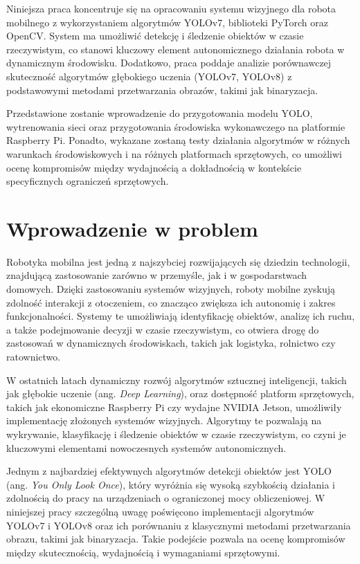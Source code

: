 \documentclass[a4paper,twoside,12pt]{book}
\begin{document}
Niniejsza praca koncentruje się na opracowaniu systemu wizyjnego dla robota mobilnego z wykorzystaniem algorytmów YOLOv7, biblioteki PyTorch oraz OpenCV. System ma umożliwić detekcję i śledzenie obiektów w czasie rzeczywistym, co stanowi kluczowy element autonomicznego działania robota w dynamicznym środowisku. Dodatkowo, praca poddaje analizie porównawczej skuteczność algorytmów głębokiego uczenia (YOLOv7, YOLOv8) z podstawowymi metodami przetwarzania obrazów, takimi jak binaryzacja. 

Przedstawione zostanie wprowadzenie do przygotowania modelu YOLO, wytrenowania sieci oraz przygotowania środowiska wykonawczego na platformie Raspberry Pi. Ponadto, wykazane zostaną testy działania algorytmów w różnych warunkach środowiskowych i na różnych platformach sprzętowych, co umożliwi ocenę kompromisów między wydajnością a dokładnością w kontekście specyficznych ograniczeń sprzętowych.

\newpage

\section{Wprowadzenie w problem}
Robotyka mobilna jest jedną z najszybciej rozwijających się dziedzin technologii, znajdującą zastosowanie zarówno w przemyśle, jak i w gospodarstwach domowych. Dzięki zastosowaniu systemów wizyjnych, roboty mobilne zyskują zdolność interakcji z otoczeniem, co znacząco zwiększa ich autonomię i zakres funkcjonalności. Systemy te umożliwiają identyfikację obiektów, analizę ich ruchu, a także podejmowanie decyzji w czasie rzeczywistym, co otwiera drogę do zastosowań w dynamicznych środowiskach, takich jak logistyka, rolnictwo czy ratownictwo.

W ostatnich latach dynamiczny rozwój algorytmów sztucznej inteligencji, takich jak głębokie uczenie (ang. \textit{Deep Learning}), oraz dostępność platform sprzętowych, takich jak ekonomiczne Raspberry Pi czy wydajne NVIDIA Jetson, umożliwiły implementację złożonych systemów wizyjnych. Algorytmy te pozwalają na wykrywanie, klasyfikację i śledzenie obiektów w czasie rzeczywistym, co czyni je kluczowymi elementami nowoczesnych systemów autonomicznych.

Jednym z najbardziej efektywnych algorytmów detekcji obiektów jest YOLO (ang. \textit{You Only Look Once}), który wyróżnia się wysoką szybkością działania i zdolnością do pracy na urządzeniach o ograniczonej mocy obliczeniowej. W niniejszej pracy szczególną uwagę poświęcono implementacji algorytmów YOLOv7 i YOLOv8 oraz ich porównaniu z klasycznymi metodami przetwarzania obrazu, takimi jak binaryzacja. Takie podejście pozwala na ocenę kompromisów między skutecznością, wydajnością i wymaganiami sprzętowymi.
\end{document}
